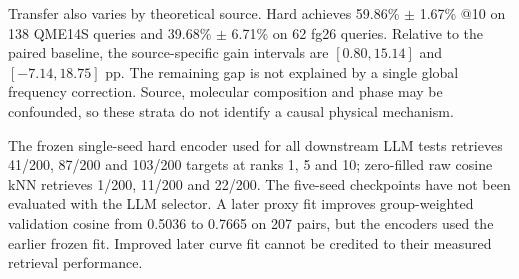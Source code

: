 Transfer also varies by theoretical source. Hard achieves 59.86\% $\pm$ 1.67\% @10 on 138 QME14S queries and 39.68\% $\pm$ 6.71\% on 62 fg26 queries. Relative to the paired baseline, the source-specific gain intervals are $[0.80,15.14]$ and $[-7.14,18.75]$ pp. The remaining gap is not explained by a single global frequency correction. Source, molecular composition and phase may be confounded, so these strata do not identify a causal physical mechanism.

The frozen single-seed hard encoder used for all downstream LLM tests retrieves 41/200, 87/200 and 103/200 targets at ranks 1, 5 and 10; zero-filled raw cosine kNN retrieves 1/200, 11/200 and 22/200. The five-seed checkpoints have not been evaluated with the LLM selector. A later proxy fit improves group-weighted validation cosine from 0.5036 to 0.7665 on 207 pairs, but the encoders used the earlier frozen fit. Improved later curve fit cannot be credited to their measured retrieval performance.


